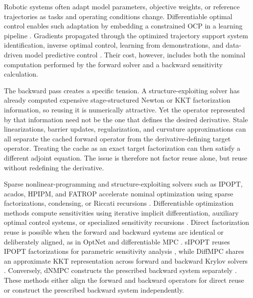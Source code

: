 \documentclass[letterpaper,10pt,conference]{ieeeconf}
\begin{document}
Robotic systems often adapt model parameters, objective weights, or
reference trajectories as tasks and operating conditions change.
Differentiable optimal control enables such adaptation by embedding a
constrained OCP in a learning pipeline
\cite{amos2017optnet,amos2018diffmpc,jin2020pdp}. Gradients propagated
through the optimized trajectory support system identification,
inverse optimal control, learning from demonstrations, and data-driven
model predictive control \cite{jin2020pdp,jin2021safepdp}. Their cost, however, includes both the nominal computation performed
by the forward solver and a backward sensitivity calculation.

The backward pass creates a specific tension. A structure-exploiting
solver has already computed expensive stage-structured Newton or KKT
factorization information, so reusing it is numerically attractive.
Yet the operator represented by that information need not be the one
that defines the desired derivative. Stale linearizations, barrier
updates, regularization, and curvature approximations can all separate
the cached forward operator from the derivative-defining target
operator. Treating the cache as an exact target factorization can then
satisfy a different adjoint equation. The issue is therefore not factor
reuse alone, but reuse without redefining the derivative.

Sparse nonlinear-programming and structure-exploiting solvers such as
IPOPT, acados, HPIPM, and FATROP accelerate nominal optimization using
sparse factorizations, condensing, or Riccati recursions
\cite{wachter2006ipopt,verschueren2022acados,frison2020hpipm,
vanroye2023fatrop,vanroye2024generalization}. Differentiable
optimization methods compute sensitivities using iterative implicit
differentiation, auxiliary optimal control systems, or specialized
sensitivity recursions
\cite{agrawal2019diffcp,jin2020pdp,jin2021safepdp,
chen2025fastdoc,chen2026panda}. Direct factorization reuse is possible when
the forward and backward systems are identical or deliberately aligned,
as in OptNet and differentiable MPC
\cite{amos2017optnet,amos2018diffmpc}. sIPOPT reuses IPOPT
factorizations for parametric sensitivity analysis
\cite{pirnay2012sipopt}, while DiffMPC shares an approximate KKT
representation across forward and backward Krylov solvers
\cite{adabag2026diffmpc}. Conversely, dNMPC constructs the prescribed
backward system separately \cite{frey2025dnmpc}. These methods either align the forward and backward operators for
direct reuse or construct the prescribed backward system independently.
\end{document}
